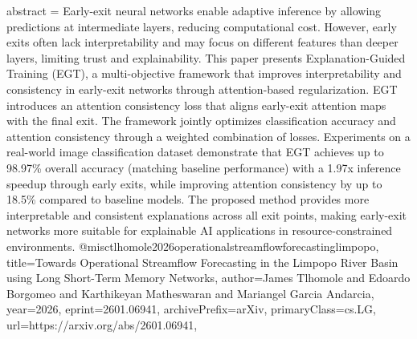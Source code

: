 {      abstract = {Early-exit neural networks enable adaptive inference by allowing predictions at intermediate layers, reducing computational cost. However, early exits often lack interpretability and may focus on different features than deeper layers, limiting trust and explainability. This paper presents Explanation-Guided Training (EGT), a multi-objective framework that improves interpretability and consistency in early-exit networks through attention-based regularization. EGT introduces an attention consistency loss that aligns early-exit attention maps with the final exit. The framework jointly optimizes classification accuracy and attention consistency through a weighted combination of losses. Experiments on a real-world image classification dataset demonstrate that EGT achieves up to 98.97\% overall accuracy (matching baseline performance) with a 1.97x inference speedup through early exits, while improving attention consistency by up to 18.5\% compared to baseline models. The proposed method provides more interpretable and consistent explanations across all exit points, making early-exit networks more suitable for explainable AI applications in resource-constrained environments.}
}@misc{tlhomole2026operationalstreamflowforecastinglimpopo,
      title={Towards Operational Streamflow Forecasting in the Limpopo River Basin using Long Short-Term Memory Networks}, 
      author={James Tlhomole and Edoardo Borgomeo and Karthikeyan Matheswaran and Mariangel Garcia Andarcia},
      year={2026},
      eprint={2601.06941},
      archivePrefix={arXiv},
      primaryClass={cs.LG},
      url={https://arxiv.org/abs/2601.06941},
}
